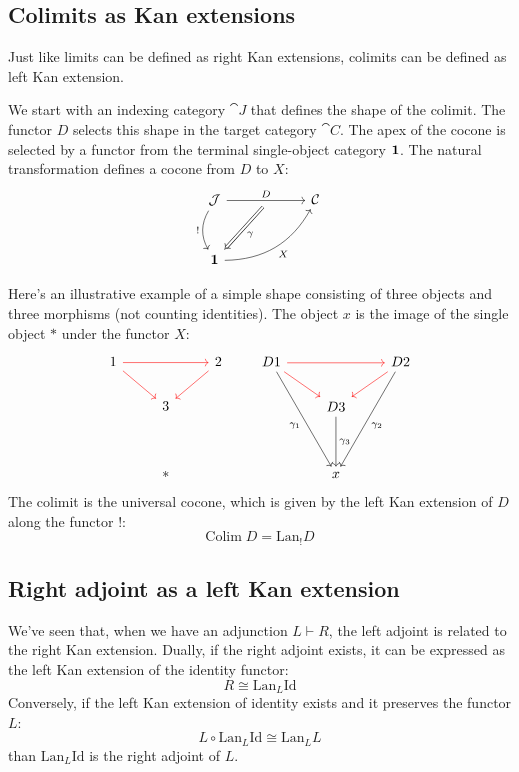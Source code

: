 \documentclass[DaoFP]{subfiles}
\begin{document}
\subsection{Colimits as Kan extensions}

Just like limits can be defined as right Kan extensions, colimits can be defined as left Kan extension. 

We start with an indexing category $\cat J$ that defines the shape of the colimit. The functor $D$ selects this shape in the target category $\cat C$. The apex of the cocone is selected by a functor from the terminal single-object category $\mathbf{1}$. The natural transformation defines a cocone from $D$ to $X$:
\[
 \begin{tikzcd} [row sep=1cm, column sep=1cm]
 \cat J
 \arrow[rr, "D", "" {name=ID, below} ]
 \arrow[d, bend right, "!"']
 && \cat C
 \\
 \Cat 1
  \arrow[urr, bend right, "X"']
 \arrow[Rightarrow, "\gamma",  from=ID]
 \end{tikzcd}
\]

Here's an illustrative example of a simple shape consisting of three objects and three morphisms (not counting identities). The object $x$ is the image of the single object $*$ under the functor $X$:
\[
 \begin{tikzcd}
1 
\arrow[rr, red]
\arrow[rd, red]
&& 2
\arrow[dl, red]
\\
& 3
\\
\\
& *
 \end{tikzcd}
 \qquad
 \begin{tikzcd}
D 1 
\arrow[rr, red]
\arrow[rd, red]
\arrow[dddr, "\gamma_1"']
&& D 2
\arrow[dl, red]
\arrow[dddl, "\gamma_2"]
\\
& D 3
\arrow[dd, "\gamma_3"]
\\
\\
&x
 \end{tikzcd}
 \]
The colimit is the universal cocone, which is given by the left Kan extension of $D$ along the functor $!$:
\[ \text{Colim}\; D = \text{Lan}_! D \]


\subsection{Right adjoint as a left Kan extension}

We've seen that, when we have an adjunction $L \vdash R$, the left adjoint is related to the right Kan extension. Dually, if the right adjoint exists, it can be expressed as the left Kan extension of the identity functor:
\[ R \cong \text{Lan}_L \text{Id} \]
Conversely, if the left Kan extension of identity exists and it preserves the functor $L$:
\[ L \circ \text{Lan}_L \text{Id} \cong \text{Lan}_L L \]
than $\text{Lan}_L \text{Id}$ is the right adjoint of $L$. 
\end{document}
